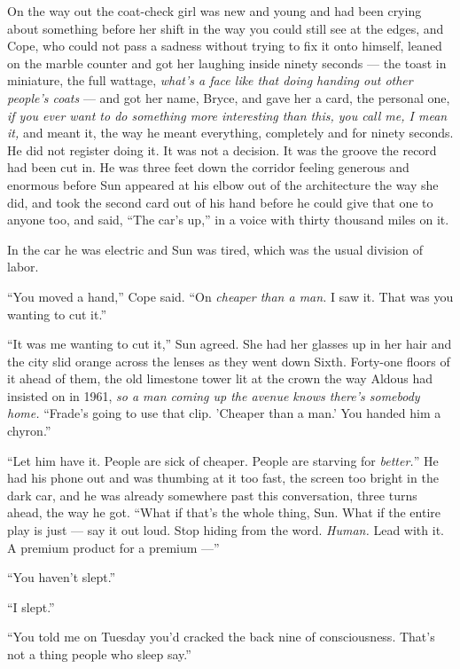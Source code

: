 \documentclass[11pt,openany]{book}
\newcommand{\scenebreak}{\par\vspace{0.5\baselineskip}\begin{center}\textasteriskcentered\quad\textasteriskcentered\quad\textasteriskcentered\end{center}\vspace{0.5\baselineskip}\par}
\begin{document}
On the way out the coat-check girl was new and young and had been crying about something before her shift in the way you could still see at the edges, and Cope, who could not pass a sadness without trying to fix it onto himself, leaned on the marble counter and got her laughing inside ninety seconds --- the toast in miniature, the full wattage, \textit{what's a face like that doing handing out other people's coats} --- and got her name, Bryce, and gave her a card, the personal one, \textit{if you ever want to do something more interesting than this, you call me, I mean it,} and meant it, the way he meant everything, completely and for ninety seconds. He did not register doing it. It was not a decision. It was the groove the record had been cut in. He was three feet down the corridor feeling generous and enormous before Sun appeared at his elbow out of the architecture the way she did, and took the second card out of his hand before he could give that one to anyone too, and said, ``The car's up,'' in a voice with thirty thousand miles on it.


\scenebreak


In the car he was electric and Sun was tired, which was the usual division of labor.

``You moved a hand,'' Cope said. ``On \textit{cheaper than a man.} I saw it. That was you wanting to cut it.''

``It was me wanting to cut it,'' Sun agreed. She had her glasses up in her hair and the city slid orange across the lenses as they went down Sixth. Forty-one floors of it ahead of them, the old limestone tower lit at the crown the way Aldous had insisted on in 1961, \textit{so a man coming up the avenue knows there's somebody home.} ``Frade's going to use that clip. 'Cheaper than a man.' You handed him a chyron.''

``Let him have it. People are sick of cheaper. People are starving for \textit{better.}'' He had his phone out and was thumbing at it too fast, the screen too bright in the dark car, and he was already somewhere past this conversation, three turns ahead, the way he got. ``What if that's the whole thing, Sun. What if the entire play is just --- say it out loud. Stop hiding from the word. \textit{Human.} Lead with it. A premium product for a premium ---''

``You haven't slept.''

``I slept.''

``You told me on Tuesday you'd cracked the back nine of consciousness. That's not a thing people who sleep say.''
\end{document}
